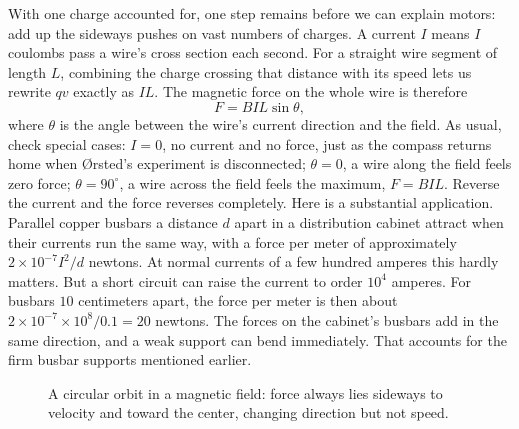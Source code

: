 \begin{mainline}
With one charge accounted for, one step remains before we can explain motors: add up the sideways pushes on vast numbers of charges. A current \(I\) means \(I\) coulombs pass a wire's cross section each second. For a straight wire segment of length \(L\), combining the charge crossing that distance with its speed lets us rewrite \(qv\) exactly as \(IL\). The magnetic force on the whole wire is therefore
\[
F=BIL\sin\theta ,
\]
where \(\theta\) is the angle between the wire's current direction and the field. As usual, check special cases: \(I=0\), no current and no force, just as the compass returns home when Ørsted's experiment is disconnected; \(\theta=0\), a wire along the field feels zero force; \(\theta=90^\circ\), a wire across the field feels the maximum, \(F=BIL\). Reverse the current and the force reverses completely. Here is a substantial application. Parallel copper busbars a distance \(d\) apart in a distribution cabinet attract when their currents run the same way, with a force per meter of approximately \(2\times10^{-7}I^{2}/d\) newtons. At normal currents of a few hundred amperes this hardly matters. But a short circuit can raise the current to order \(10^{4}\) amperes. For busbars \(10\) centimeters apart, the force per meter is then about \(2\times10^{-7}\times10^{8}/0.1=20\) newtons. The forces on the cabinet's busbars add in the same direction, and a weak support can bend immediately. That accounts for the firm busbar supports mentioned earlier.
\end{mainline}

\begin{figure}[htbp]
\centering
{}
\caption{A circular orbit in a magnetic field: force always lies sideways to velocity and toward the center, changing direction but not speed.}
\end{figure}

